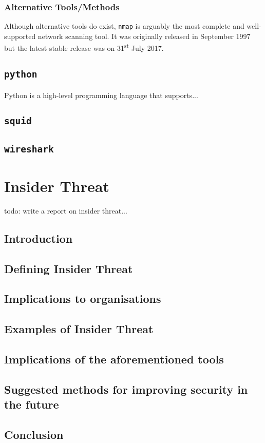\documentclass[12pt]{report}
\begin{document}
\subsection*{Alternative Tools/Methods}
Although alternative tools do exist, \texttt{nmap} is arguably the most complete and well-supported network scanning tool. It was originally released in September 1997 but the latest stable release was on 31\textsuperscript{st} July 2017.

\section{\texttt{python}}
Python is a high-level programming language that supports...
\section{\texttt{squid}}
\section{\texttt{wireshark}}


\pagebreak
\chapter{Insider Threat}
todo: write a report on insider threat...
\section{Introduction}
\section{Defining Insider Threat}
\section{Implications to organisations}
\section{Examples of Insider Threat}
\section{Implications of the aforementioned tools}
\section{Suggested methods for improving security in the future}
\section{Conclusion}
\end{document}
